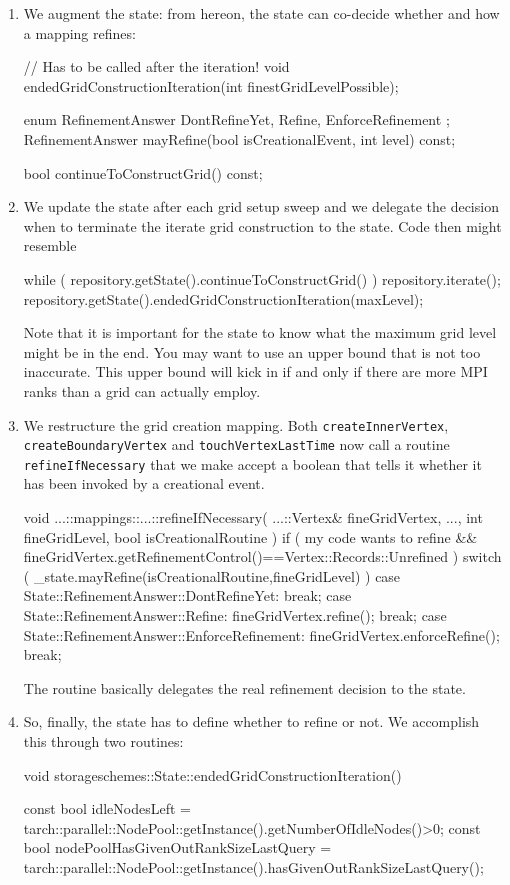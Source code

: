 \begin{enumerate}
  \item We augment the state: from hereon, the state can co-decide whether and
    how a mapping refines:
    \begin{code}
    // Has to be called after the iteration!
    void endedGridConstructionIteration(int finestGridLevelPossible);

    enum RefinementAnswer {
      DontRefineYet,
      Refine,
      EnforceRefinement
    };
    RefinementAnswer mayRefine(bool isCreationalEvent, int level) const;

    bool continueToConstructGrid() const;
    \end{code}


  \item We update the state after each grid setup sweep and we delegate the
  decision when to terminate the iterate grid construction to the state.
  Code then might resemble
    \begin{code}
  while ( repository.getState().continueToConstructGrid() ) {
    repository.iterate();
    repository.getState().endedGridConstructionIteration(maxLevel);
  }
    \end{code}
    Note that it is important for the state to know what the maximum grid level
    might be in the end. You may want to use an upper bound that is not too
    inaccurate. This upper bound will kick in if and only if there are more MPI
    ranks than a grid can actually employ.

  \item We restructure the grid creation mapping. Both
    \texttt{createInnerVertex}, \texttt{createBoundaryVertex} and
    \texttt{touchVertexLastTime} now call a routine \texttt{refineIfNecessary}
    that we make accept a boolean that tells it whether it has been invoked by a
    creational event.
    \begin{code}
void ...::mappings::...::refineIfNecessary(
  ...::Vertex&  fineGridVertex,
  ...,
  int           fineGridLevel,
  bool          isCreationalRoutine
) {
  if (
    my code wants to refine
    &&
    fineGridVertex.getRefinementControl()==Vertex::Records::Unrefined
  ) {
    switch ( _state.mayRefine(isCreationalRoutine,fineGridLevel) ) {
      case State::RefinementAnswer::DontRefineYet:
        break;
      case State::RefinementAnswer::Refine:
        fineGridVertex.refine();
        break;
      case State::RefinementAnswer::EnforceRefinement:
        fineGridVertex.enforceRefine();
        break;
    }
  }
}
    \end{code} 
    The routine basically delegates the real refinement decision to the state. 
  \item So, finally, the state has to define whether to refine or not. We
  accomplish this through two routines:
  \begin{code}
void storageschemes::State::endedGridConstructionIteration() {
  const bool idleNodesLeft = 
    tarch::parallel::NodePool::getInstance().getNumberOfIdleNodes()>0;
  const bool nodePoolHasGivenOutRankSizeLastQuery = 
    tarch::parallel::NodePool::getInstance().hasGivenOutRankSizeLastQuery();

}
\end{code}
\end{enumerate}
